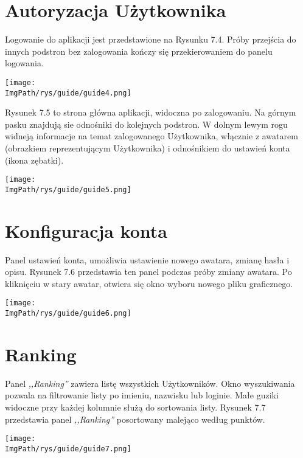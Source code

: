 \documentclass[a4paper,12pt,twoside,openany]{report}
\newcommand{\ImgPath}{.}
\begin{document}
\section{Autoryzacja Użytkownika}
Logowanie do aplikacji jest przedstawione na Rysunku 7.4. Próby przejścia do innych podstron bez zalogowania kończy się przekierowaniem do panelu logowania.
								\begin{sidewaysfigure}[!htbp]
									\begin{center}
										\centering
										\texttt{[image: \\ImgPath/rys/guide/guide4.png]}
									\end{center}
									\caption{}
									\label{UMLTS}
								\end{sidewaysfigure}
Rysunek 7.5 to strona główna aplikacji, widoczna po zalogowaniu. Na górnym pasku znajdują sie odnośniki do kolejnych podstron. W dolnym lewym rogu widneją informacje na temat zalogowanego Użytkownika, włącznie z awatarem (obrazkiem reprezentującym Użytkownika) i odnośnikiem do ustawień konta (ikona zębatki).
								\begin{sidewaysfigure}[!htbp]
									\begin{center}
										\centering
										\texttt{[image: \\ImgPath/rys/guide/guide5.png]}
									\end{center}
									\caption{}
									\label{UMLTS}
								\end{sidewaysfigure}

\section{Konfiguracja konta}
Panel ustawień konta, umożliwia ustawienie nowego awatara, zmianę hasła i opisu. Rysunek 7.6 przedstawia ten panel podczas próby zmiany awatara. Po kliknięciu w stary awatar, otwiera się okno wyboru nowego pliku graficznego.
								\begin{sidewaysfigure}[!htbp]
									\begin{center}
										\centering
										\texttt{[image: \\ImgPath/rys/guide/guide6.png]}
									\end{center}
									\caption{}
									\label{UMLTS}
								\end{sidewaysfigure}
\section{Ranking}
Panel \textit{,,Ranking''} zawiera listę wszystkich Użytkowników. Okno wyszukiwania pozwala na filtrowanie listy po imieniu, nazwisku lub loginie. Małe guziki widoczne przy każdej kolumnie służą do sortowania listy. Rysunek 7.7 przedstawia panel \textit{,,Ranking''} posortowany malejąco według punktów.
								\begin{sidewaysfigure}
									\begin{center}
										\centering
										\texttt{[image: \\ImgPath/rys/guide/guide7.png]}
									\end{center}
									\caption{}
									\label{UMLTS}
								\end{sidewaysfigure}
\end{document}
